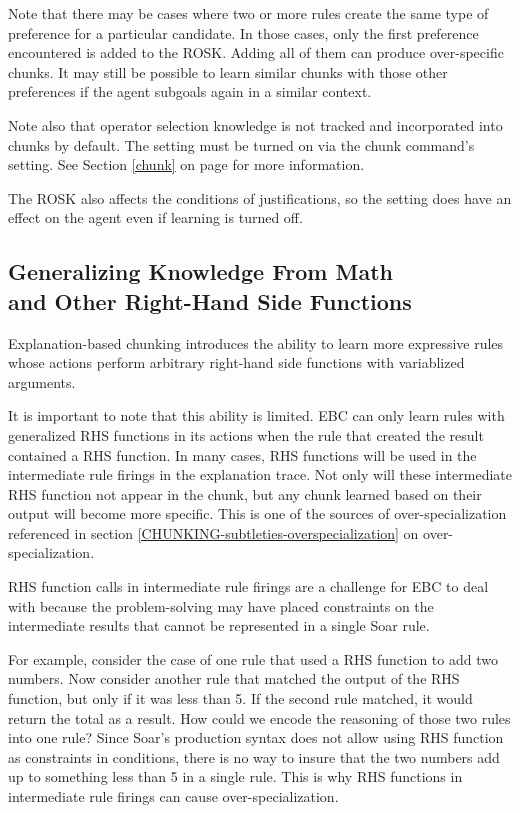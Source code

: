 Note that there may be cases where two or more rules create the same type of preference for a particular candidate. In those cases, only the first preference encountered is added to the ROSK. Adding all of them can produce over-specific chunks. It may still be possible to learn similar chunks with those other preferences if the agent subgoals again in a similar context.

Note also that operator selection knowledge is not tracked and incorporated into chunks by default. The setting must be turned on via the chunk command's  setting. See Section \ref{chunk} on page \pageref{chunk} for more information.

The ROSK also affects the conditions of justifications, so the  setting does have an effect on the agent even if learning is turned off.

\subsection{\texorpdfstring{Generalizing Knowledge From Math \\ and Other Right-Hand Side Functions}{Generalizing From RHS Functions}}
\label{CHUNKING-subtleties-rhs-functions}

Explanation-based chunking introduces the ability to learn more expressive rules whose actions perform arbitrary right-hand side functions with variablized arguments.

It is important to note that this ability is limited.  EBC can only learn rules with generalized RHS functions in its actions when the rule that created the result contained a RHS function.  In many cases, RHS functions will be used in the intermediate rule firings in the explanation trace.  Not only will these intermediate RHS function not appear in the chunk, but any chunk learned based on their output will become more specific.  This is one of the sources of over-specialization referenced in section \ref{CHUNKING-subtleties-overspecialization} on over-specialization.

RHS function calls in intermediate rule firings are a challenge for EBC to deal with because the problem-solving may have placed constraints on the intermediate results that cannot be represented in a single Soar rule.

For example, consider the case of one rule that used a RHS function to add two numbers.  Now consider another rule that matched the output of the RHS function, but only if it was less than 5.  If the second rule matched, it would return the total as a result.  How could we encode the reasoning of those two rules into one rule?  Since Soar's production syntax does not allow using RHS function as constraints in conditions, there is no way to insure that the two numbers add up to something less than 5 in a single rule.  This is why RHS functions in intermediate rule firings can cause over-specialization.

